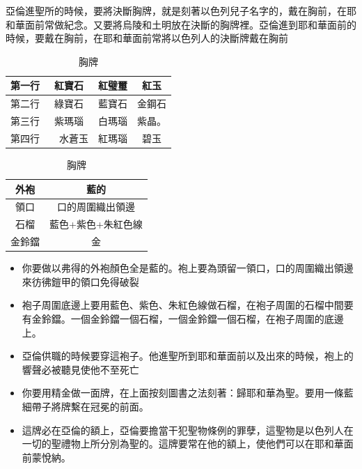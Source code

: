 \begin{table}
亞倫進聖所的時候，要將決斷胸牌，就是刻著以色列兒子名字的，戴在胸前，在耶和華面前常做紀念。又要將烏陵和土明放在決斷的胸牌裡。亞倫進到耶和華面前的時候，要戴在胸前，在耶和華面前常將以色列人的決斷牌戴在胸前


\begin{table}[H]
    \begin{minipage}{.5\linewidth}
      \centering
       \begin{tabular}{|c|c|c|c| }
\hline
\hline
第一行 & 紅寶石&紅璧璽&紅玉  \\\hline
第二行&綠寶石&藍寶石&金鋼石  \\\hline
第三行&紫瑪瑙&白瑪瑙&紫晶。 \\\hline
第四行&　水蒼玉&紅瑪瑙&碧玉　\\\hline
\end{tabular}
   \caption{胸牌}
    \end{minipage}%
    \begin{minipage}{.5\linewidth}
      \centering    
     \begin{tabular}{|c|c| }
\hline
\hline
外袍 & 藍的  \\\hline
領口&口的周圍織出領邊  \\\hline
石榴&藍色+紫色+朱紅色線 \\\hline
金鈴鐺&金　\\\hline
\end{tabular}
    \end{minipage} 
\end{table}


\begin{itemize} 
\itemsep-.35em
\item 你要做以弗得的外袍顏色全是藍的。袍上要為頭留一領口，口的周圍織出領邊來彷彿鎧甲的領口免得破裂
\item 袍子周圍底邊上要用藍色、紫色、朱紅色線做石榴，在袍子周圍的石榴中間要有金鈴鐺。一個金鈴鐺一個石榴，一個金鈴鐺一個石榴，在袍子周圍的底邊上。
\item 亞倫供職的時候要穿這袍子。他進聖所到耶和華面前以及出來的時候，袍上的響聲必被聽見使他不至死亡
\end{itemize}


\begin{itemize} 
\itemsep-.35em
\item 你要用精金做一面牌，在上面按刻圖書之法刻著：歸耶和華為聖。要用一條藍細帶子將牌繫在冠冕的前面。
\item 這牌必在亞倫的額上，亞倫要擔當干犯聖物條例的罪孽，這聖物是以色列人在一切的聖禮物上所分別為聖的。這牌要常在他的額上，使他們可以在耶和華面前蒙悅納。
\end{itemize}


\end{table}
